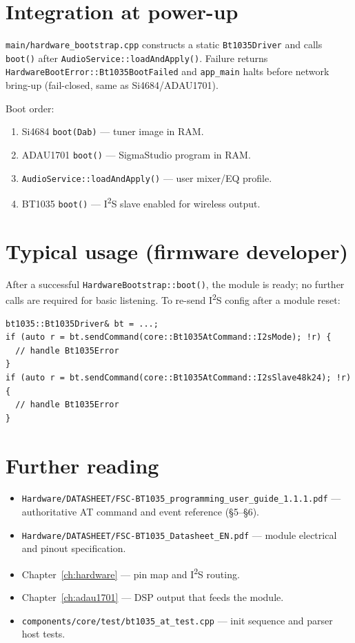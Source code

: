 \section{Integration at power-up}
\label{sec:bt1035-integration}

\texttt{main/hardware\_bootstrap.cpp} constructs a static
\texttt{Bt1035Driver} and calls \texttt{boot()} after
\texttt{AudioService::loadAndApply()}. Failure returns
\texttt{HardwareBootError::Bt1035BootFailed} and \texttt{app\_main} halts
before network bring-up (fail-closed, same as Si4684/ADAU1701).

Boot order:
\begin{enumerate}
  \item Si4684 \texttt{boot(Dab)} --- tuner image in RAM.
  \item ADAU1701 \texttt{boot()} --- SigmaStudio program in RAM.
  \item \texttt{AudioService::loadAndApply()} --- user mixer/EQ profile.
  \item BT1035 \texttt{boot()} --- I\textsuperscript{2}S slave enabled for wireless output.
\end{enumerate}

\section{Typical usage (firmware developer)}
\label{sec:bt1035-usage}

After a successful \texttt{HardwareBootstrap::boot()}, the module is ready;
no further calls are required for basic listening. To re-send I\textsuperscript{2}S config
after a module reset:

\begin{verbatim}
bt1035::Bt1035Driver& bt = ...;
if (auto r = bt.sendCommand(core::Bt1035AtCommand::I2sMode); !r) {
  // handle Bt1035Error
}
if (auto r = bt.sendCommand(core::Bt1035AtCommand::I2sSlave48k24); !r) {
  // handle Bt1035Error
}
\end{verbatim}

\section{Further reading}
\label{sec:bt1035-reading}

\begin{itemize}
  \item \texttt{Hardware/DATASHEET/FSC-BT1035\_programming\_user\_guide\_1.1.1.pdf}
        --- authoritative AT command and event reference (§5--§6).
  \item \texttt{Hardware/DATASHEET/FSC-BT1035\_Datasheet\_EN.pdf} --- module
        electrical and pinout specification.
  \item Chapter~\ref{ch:hardware} --- pin map and I\textsuperscript{2}S routing.
  \item Chapter~\ref{ch:adau1701} --- DSP output that feeds the module.
  \item \texttt{components/core/test/bt1035\_at\_test.cpp} --- init sequence
        and parser host tests.
\end{itemize}
